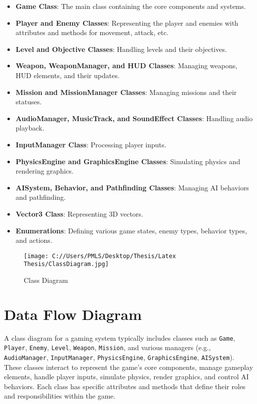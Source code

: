 \begin{itemize}
	\item \textbf{Game Class}: The main class containing the core components and systems.
	\item \textbf{Player and Enemy Classes}: Representing the player and enemies with attributes and methods for movement, attack, etc.
	\item \textbf{Level and Objective Classes}: Handling levels and their objectives.
	\item \textbf{Weapon, WeaponManager, and HUD Classes}: Managing weapons, HUD elements, and their updates.
	\item \textbf{Mission and MissionManager Classes}: Managing missions and their statuses.
	\item \textbf{AudioManager, MusicTrack, and SoundEffect Classes}: Handling audio playback.
	\item \textbf{InputManager Class}: Processing player inputs.
	\item \textbf{PhysicsEngine and GraphicsEngine Classes}: Simulating physics and rendering graphics.
	\item \textbf{AISystem, Behavior, and Pathfinding Classes}: Managing AI behaviors and pathfinding.
	\item \textbf{Vector3 Class}: Representing 3D vectors.
	\item \textbf{Enumerations}: Defining various game states, enemy types, behavior types, and actions.
\end{itemize}

\begin{figure}[H]
	\centering
	\texttt{[image: C://Users/PMLS/Desktop/Thesis/Latex Thesis/ClassDiagram.jpg]}
	\caption{Class Diagram}
	\label{fig:Class Diagram}
\end{figure}


\section{Data Flow Diagram}
A class diagram for a gaming system typically includes classes such as \texttt{Game}, \texttt{Player}, \texttt{Enemy}, \texttt{Level}, \texttt{Weapon}, \texttt{Mission}, and various managers (e.g., \texttt{AudioManager}, \texttt{InputManager}, \texttt{PhysicsEngine}, \texttt{GraphicsEngine}, \texttt{AISystem}). These classes interact to represent the game's core components, manage gameplay elements, handle player inputs, simulate physics, render graphics, and control AI behaviors. Each class has specific attributes and methods that define their roles and responsibilities within the game.

